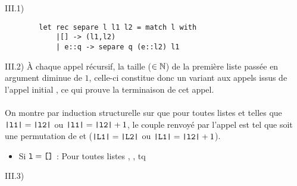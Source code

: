 \begin{question}{III.1) }{}
    \begin{verbatim}
        let rec separe l l1 l2 = match l with
            |[] -> (l1,l2)
            | e::q -> separe q (e::l2) l1
    \end{verbatim}
\end{question}

\begin{question}{III.2) }{}
    À chaque appel récursif, la taille ($\in \mathbb{N}$) de la première liste passée en argument diminue de $1$, celle-ci constitue donc un variant aux appels issus de l'appel initial , ce qui prouve la terminaison de cet appel. \\ \\
    On montre par induction structurelle sur  que pour toutes listes  et  telles que $\texttt{|l1|} = \texttt{|l2|}$ ou $\texttt{|l1|} = \texttt{|l2|} + 1$, le couple  renvoyé par l'appel  est tel que  soit une permutation de  et ($\texttt{|L1|} = \texttt{|L2|}$ ou $\texttt{|L1|} = \texttt{|l2|}+1$). \begin{itemize}
        \item Si $\texttt{l} = \texttt{[]}$ : Pour toutes listes , , tq 
    \end{itemize}
\end{question}

\begin{question}{III.3) }{}

\end{question}


